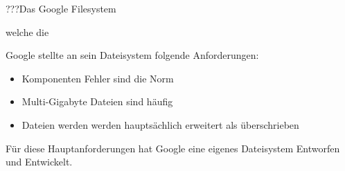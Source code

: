 ???Das Google Filesystem 

welche die


 Google stellte an sein Dateisystem folgende Anforderungen: 
\begin{itemize}
\item Komponenten Fehler sind die Norm
\item Multi-Gigabyte Dateien sind häufig
\item Dateien werden werden hauptsächlich erweitert als überschrieben
\end{itemize}

Für diese Hauptanforderungen hat Google eine eigenes Dateisystem Entworfen und Entwickelt.



